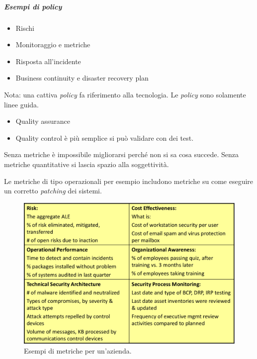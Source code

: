 \subparagraph{Esempi di policy}

\begin{itemize}
\item Rischi
\item Monitoraggio e metriche
\item Risposta all'incidente
\item Business continuity e disaster recovery plan
\end{itemize}

Nota: una cattiva \textit{policy} fa riferimento alla tecnologia. Le 
\textit{policy} sono solamente linee guida.


\begin{itemize}
\item Quality assurance 
\item Quality control è più semplice si può validare con dei test.
\end{itemize}






Senza metriche è impossibile migliorarsi perché non si sa cosa succede.
Senza metriche quantitative si lascia spazio alla soggettività.


Le metriche di tipo operazionali per esempio includono metriche su come eseguire 
un corretto \textit{patching} dei sistemi.


\begin{figure}[h!]
        \begin{center}
                \includegraphics[scale=1.5]{res/img/metriche}
        \end{center}
        \caption{Esempi di metriche per un'azienda.}
        
\end{figure}

